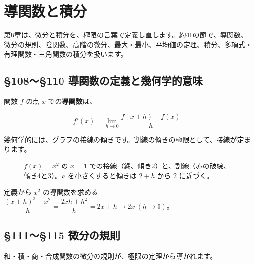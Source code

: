 \documentclass[a4paper,11pt,openany]{ltjsbook}
\begin{document}
\chapter{導関数と積分}

第6章は、微分と積分を、極限の言葉で定義し直します。約41の節で、導関数、微分の規則、陰関数、高階の微分、最大・最小、平均値の定理、積分、多項式・有理関数・三角関数の積分を扱います。

\section{§108〜§110 導関数の定義と幾何学的意味}

関数 $f$ の点 $x$ での\textbf{導関数}は、

\[
f'(x)=\lim_{h\to0}\frac{f(x+h)-f(x)}{h}.
\]

幾何学的には、グラフの接線の傾きです。割線の傾きの極限として、接線が定まります。

\begin{figure}[htbp]
\centering
{}
\caption{$f(x)=x^2$ の $x=1$ での接線（緑、傾き2）と、割線（赤の破線、傾き4と3）。$h$ を小さくすると傾きは $2+h$ から $2$ に近づく。}
\end{figure}

\begin{examplebox}{定義から $x^2$ の導関数を求める}
$\dfrac{(x+h)^2-x^2}{h}=\dfrac{2xh+h^2}{h}=2x+h\to2x\ (h\to0)$。
\end{examplebox}

\section{§111〜§115 微分の規則}

和・積・商・合成関数の微分の規則が、極限の定理から導かれます。
\end{document}
